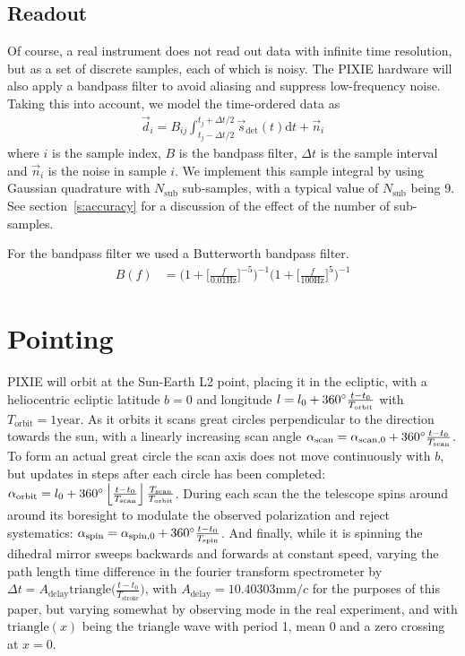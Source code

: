 \documentclass{article}
\begin{document}
\subsection{Readout}
Of course, a real instrument does not read out data with infinite
time resolution, but as a set of discrete samples, each of which is
noisy. The PIXIE hardware will also apply a bandpass filter to avoid
aliasing and suppress low-frequency noise. Taking this into account,
we model the time-ordered data as
\begin{align}
	\vec d_i = B_{ij} \int_{t_j-\Delta t/2}^{t_j+\Delta t/2} \vec s_\textrm{det}(t) \textrm{d}t + \vec n_i
\end{align}
where $i$ is the sample index, $B$ is the bandpass filter, $\Delta t$ is the sample
interval and $\vec n_i$ is the noise in sample $i$. We implement this
sample integral by using Gaussian quadrature with $N_\textrm{sub}$ sub-samples,
with a typical value of $N_\textrm{sub}$ being 9. See section~\ref{s:accuracy}
for a discussion of the effect of the number of sub-samples.

For the bandpass filter we used a Butterworth bandpass filter.
\begin{align}
	B(f) &= \Big(1+\Big[\frac{f}{0.01\textrm{Hz}}\Big]^{-5}\Big)^{-1}
		\Big(1+\Big[\frac{f}{100\textrm{Hz}}\Big]^{5}\Big)^{-1}
\end{align}

\section{Pointing}
PIXIE will orbit at the Sun-Earth L2 point, placing it in the ecliptic, with
a heliocentric ecliptic latitude $b=0$ and longitude $l=l_0 +
360\degree\frac{t-t_0}{T_\textrm{orbit}}$ with $T_\textrm{orbit} = 1\textrm{year}$.
As it orbits it scans great circles
perpendicular to the direction towards the sun, with a linearly increasing scan angle
$\alpha_\textrm{scan} = \alpha_{\textrm{scan},0} + 360\degree \frac{t-t_0}{T_\textrm{scan}}$.
To form an actual great circle the scan axis does not
move continuously with $b$, but updates in steps after each circle has been completed:
$\alpha_\textrm{orbit} = l_0 + 360\degree\left\lfloor\frac{t-t_0}{T_\textrm{scan}}\right\rfloor\frac{T_\textrm{scan}}{T_\textrm{orbit}}$.
During each scan the the telescope spins around around its boresight to modulate
the observed polarization and reject systematics: $\alpha_\textrm{spin} =
\alpha_{\textrm{spin},0} + 360\degree\frac{t-t_0}{T_\textrm{spin}}$. And finally,
while it is spinning the dihedral mirror sweeps backwards and forwards at constant
speed, varying the path length time difference in the fourier transform spectrometer
by $\Delta t = A_\textrm{delay}\textrm{triangle}\Big(\frac{t-t_0}{T_\textrm{stroke}}\Big)$,
with $A_\textrm{delay} = 10.40303 \textrm{mm}/c$ for the purposes of this paper, but
varying somewhat by observing mode in the real experiment, and with
$\textrm{triangle}(x)$ being the triangle wave with period 1, mean 0 and a zero
crossing at $x=0$.
\end{document}
